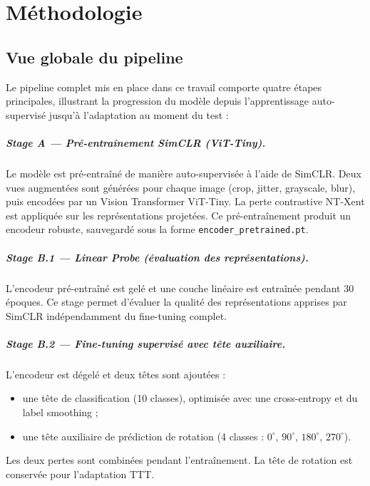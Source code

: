 \documentclass[12pt,a4paper]{report}
\begin{document}
	
	\chapter{Méthodologie}
	
	\section{Vue globale du pipeline}
	Le pipeline complet mis en place dans ce travail comporte quatre étapes principales, illustrant la progression du modèle depuis l’apprentissage auto-supervisé jusqu’à l’adaptation au moment du test :
	
	\paragraph{Stage A — Pré-entraînement SimCLR (ViT-Tiny).}
	Le modèle est pré-entraîné de manière auto-supervisée à l’aide de SimCLR.  
	Deux vues augmentées sont générées pour chaque image (crop, jitter, grayscale, blur), puis encodées par un Vision Transformer ViT-Tiny.  
	La perte contrastive NT-Xent est appliquée sur les représentations projetées.  
	Ce pré-entraînement produit un encodeur robuste, sauvegardé sous la forme \texttt{encoder\_pretrained.pt}.
	
	\paragraph{Stage B.1 — Linear Probe (évaluation des représentations).}
	L’encodeur pré-entraîné est gelé et une couche linéaire est entraînée pendant 30 époques.  
	Ce stage permet d’évaluer la qualité des représentations apprises par SimCLR indépendamment du fine-tuning complet.
	
	\paragraph{Stage B.2 — Fine-tuning supervisé avec tête auxiliaire.}
	L’encodeur est dégelé et deux têtes sont ajoutées :
	\begin{itemize}
		\item une tête de classification (10 classes), optimisée avec une cross-entropy et du label smoothing ;
		\item une tête auxiliaire de prédiction de rotation (4 classes : $0^\circ$, $90^\circ$, $180^\circ$, $270^\circ$).
	\end{itemize}
	Les deux pertes sont combinées pendant l’entraînement.  
	La tête de rotation est conservée pour l’adaptation TTT.
	
\end{document}
